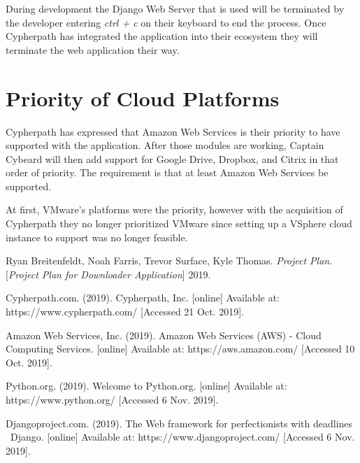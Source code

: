 \documentclass{article}
\begin{document}
        During development the Django Web Server that is used will be terminated by the developer entering \textit{ctrl + c} on their keyboard to end the process. Once Cypherpath has integrated the application into
        their ecosystem they will terminate the web application their way.

    \section{Priority of Cloud Platforms}
    Cypherpath has expressed that Amazon Web Services is their priority to have supported with the application. After those modules are working, Captain Cybeard will then add support
    for Google Drive, Dropbox, and Citrix in that order of priority. The requirement is that at least Amazon Web Services be supported.

    At first, VMware's platforms were the priority, however with the acquisition of Cypherpath they no longer prioritized VMware since setting up a VSphere cloud instance to support was no longer feasible.
    
    
    \newpage
    \begin{thebibliography}{6}
    Ryan Breitenfeldt, Noah Farris, Trevor Surface, Kyle Thomas.
    \textit{Project Plan}.
    [\textit{Project Plan for Downloader Application}] 2019.

    Cypherpath.com. (2019). Cypherpath, Inc. [online] Available at: https://www.cypherpath.com/ [Accessed 21 Oct. 2019].

    Amazon Web Services, Inc. (2019). Amazon Web Services (AWS) - Cloud Computing Services. [online] Available at: https://aws.amazon.com/ [Accessed 10 Oct. 2019].

    Python.org. (2019). Welcome to Python.org. [online] Available at: https://www.python.org/ [Accessed 6 Nov. 2019].

    Djangoproject.com. (2019). The Web framework for perfectionists with deadlines \textbar\ Django. [online] Available at: https://www.djangoproject.com/ [Accessed 6 Nov. 2019].
    \end{thebibliography}
\end{document}
